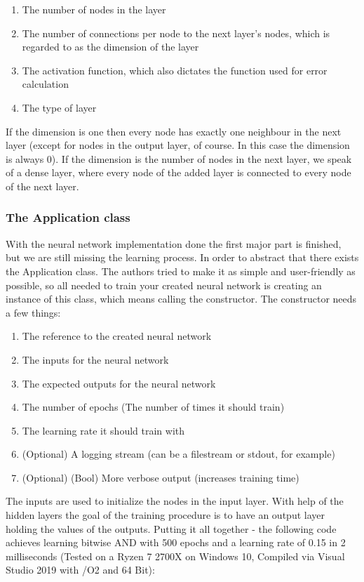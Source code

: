 \begin{enumerate}
	\item The number of nodes in the layer
	\item The number of connections per node to the next layer's nodes, which is regarded to as the dimension of the layer
	\item The activation function, which also dictates the function used for error calculation
	\item The type of layer
\end{enumerate}
	
If the dimension is one then every node has exactly one neighbour in the next layer (except for nodes in the output layer, of course. In this case the dimension is always 0). If the dimension is the number of nodes in the next layer, we speak of a dense layer, where every node of the added layer is connected to every node of the next layer.

\subsubsection{The Application class}

With the neural network implementation done the first major part is finished, but we are still missing the learning process. In order to abstract that there exists the Application class. The authors tried to make it as simple and user-friendly as possible, so all needed to train your created neural network is creating an instance of this class, which means calling the constructor. The constructor needs a few things: 

\begin{enumerate}
	\item The reference to the created neural network
	\item The inputs for the neural network
	\item The expected outputs for the neural network
	\item The number of epochs (The number of times it should train)
	\item The learning rate it should train with
	\item (Optional) A logging stream (can be a filestream or stdout, for example)
	\item (Optional) (Bool) More verbose output (increases training time)
\end{enumerate}

The inputs are used to initialize the nodes in the input layer. With help of the hidden layers the goal of the training procedure is to have an output layer holding the values of the outputs. Putting it all together - the following code achieves learning bitwise AND with 500 epochs and a learning rate of 0.15 in 2 milliseconds (Tested on a Ryzen 7 2700X on Windows 10, Compiled via Visual Studio 2019 with /O2 and 64 Bit):


